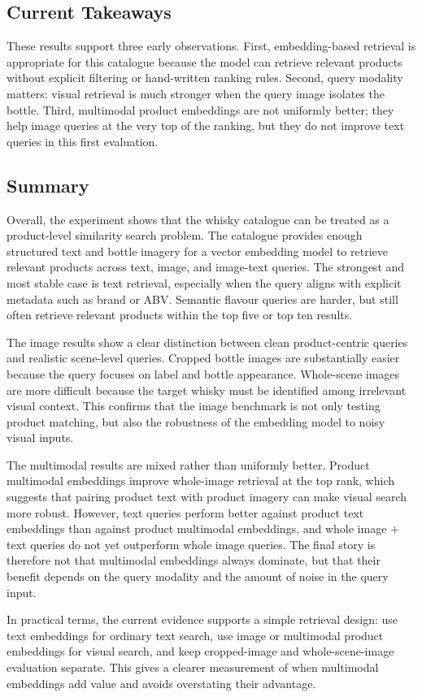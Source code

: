 \subsection{Current Takeaways}

These results support three early observations. First, embedding-based retrieval is appropriate for this catalogue because the model can retrieve relevant products without explicit filtering or hand-written ranking rules. Second, query modality matters: visual retrieval is much stronger when the query image isolates the bottle. Third, multimodal product embeddings are not uniformly better; they help image queries at the very top of the ranking, but they do not improve text queries in this first evaluation.

\subsection{Summary}

Overall, the experiment shows that the whisky catalogue can be treated as a product-level similarity search problem. The catalogue provides enough structured text and bottle imagery for a vector embedding model to retrieve relevant products across text, image, and image-text queries. The strongest and most stable case is text retrieval, especially when the query aligns with explicit metadata such as brand or ABV. Semantic flavour queries are harder, but still often retrieve relevant products within the top five or top ten results.

The image results show a clear distinction between clean product-centric queries and realistic scene-level queries. Cropped bottle images are substantially easier because the query focuses on label and bottle appearance. Whole-scene images are more difficult because the target whisky must be identified among irrelevant visual context. This confirms that the image benchmark is not only testing product matching, but also the robustness of the embedding model to noisy visual inputs.

The multimodal results are mixed rather than uniformly better. Product multimodal embeddings improve whole-image retrieval at the top rank, which suggests that pairing product text with product imagery can make visual search more robust. However, text queries perform better against product text embeddings than against product multimodal embeddings, and whole image + text queries do not yet outperform whole image queries. The final story is therefore not that multimodal embeddings always dominate, but that their benefit depends on the query modality and the amount of noise in the query input.

In practical terms, the current evidence supports a simple retrieval design: use text embeddings for ordinary text search, use image or multimodal product embeddings for visual search, and keep cropped-image and whole-scene-image evaluation separate. This gives a clearer measurement of when multimodal embeddings add value and avoids overstating their advantage.
